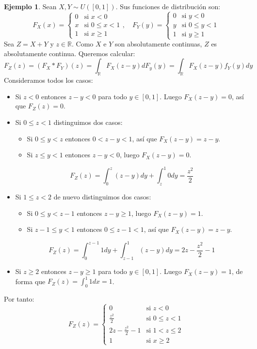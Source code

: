 \documentclass{report}
\theoremstyle{remark}
\theoremstyle{remark}
\theoremstyle{remark}
\theoremstyle{definition}
\theoremstyle{definition}
\theoremstyle{definition}
\newtheorem*{example}{Ejemplo}
\theoremstyle{definition}
\begin{document}
\begin{example}
    Sean $X, Y \sim U([0, 1])$. Sus funciones de distribución son:
    $$F_X(x) = \begin{cases}
            0 & \text{si } x < 0        \\
            x & \text{si } 0 \leq x < 1 \\
            1 & \text{si } x \geq 1
        \end{cases}, \quad
        F_Y(y) = \begin{cases}
            0 & \text{si } y < 0        \\
            y & \text{si } 0 \leq y < 1 \\
            1 & \text{si } y \geq 1
        \end{cases}$$
    Sea $Z = X+Y$ y $z \in \mathbb{R}$.
    Como $X$ e $Y$ son absolutamente continuas, $Z$ es absolutamente continua.
    Queremos calcular:
    $$F_Z(z) = (F_X \ast F_Y)(z) = \int_\mathbb{R} F_X(z-y)dF_y(y) = \int_\mathbb{R} F_X(z-y) f_Y(y) dy$$
    Consideramos todos los casos:
    \begin{itemize}
        \item Si $z < 0$ entonces $z-y<0$ para todo $y \in [0, 1]$.
              Luego $F_X(z-y) = 0$, así que $F_Z(z) = 0$.
        \item Si $0 \leq z < 1$ distinguimos dos casos:
              \begin{itemize}
                  \item Si $0 \leq y < z$ entonces $0 < z-y < 1$, así que $F_X(z-y) = z-y$.
                  \item Si $z \leq y < 1$ entonces $z-y < 0$, luego $F_X(z-y) = 0$.
              \end{itemize}
              $$F_Z(z) = \int_0^z (z-y) dy + \int_z^1 0 dy = \frac{z^2}{2}$$
        \item Si $1 \leq z < 2$ de nuevo distinguimos dos casos:
              \begin{itemize}
                  \item Si $0 \leq y < z-1$ entonces $z-y \geq 1$, luego $F_X(z-y) = 1$.
                  \item Si $z-1 \leq y < 1$ entonces $0 \leq z-1 < 1$, así que $F_X(z-y) = z-y$.
              \end{itemize}
              $$F_Z(z) = \int_0^{z-1} 1 dy + \int_{z-1}^1 (z-y) dy = 2z - \frac{z^2}{2} - 1$$
        \item Si $z \geq 2$ entonces $z-y \geq 1$ para todo $y \in [0, 1]$.
              Luego $F_X(z-y) = 1$, de forma que $F_Z(z) = \int_0^1 1 dx = 1$.
    \end{itemize}
    Por tanto:
    $$F_Z(z) = \begin{cases}
            0                      & \text{si } z < 0        \\
            \frac{z^2}{2}          & \text{si } 0 \leq z < 1 \\
            2z - \frac{z^2}{2} - 1 & \text{si } 1 < z \leq 2 \\
            1                      & \text{si } x \geq 2
        \end{cases}$$
\end{example}
\end{document}
